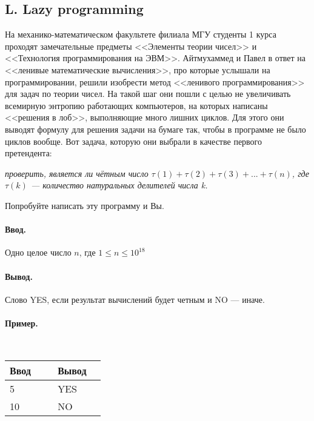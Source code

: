 \documentclass[12pt, a4paper]{article}
\newcommand{\informat}[1]
{
	\paragraph{Ввод.\\} #1
}
\newcommand{\outformat}[1]
{
	\paragraph{Вывод.\\} #1
}
\newcommand{\examplee}[4]
{
	\paragraph{Пример.\\}
	{\tt
	\begin{tabular}{|p{0.4\linewidth}|p{0.4\linewidth}|}
	\hline
	Ввод 	& Вывод  	\\
	\hline
	#1 		& #2 		\\
	\hline
	#3		& #4		\\
	\hline
	\end{tabular}
	}
}
\begin{document}
\subsection*{L. Lazy programming}

На механико-математическом факультете филиала МГУ студенты 1 курса проходят замечательные предметы <<Элементы теории чисел>> и <<Технология программирования на ЭВМ>>. Айтмухаммед и Павел в ответ на <<ленивые математические вычисления>>, про которые услышали на программировании, решили изобрести метод <<ленивого программирования>> для задач по теории чисел. На такой шаг они пошли с целью не увеличивать всемирную энтропию работающих компьютеров, на которых написаны <<решения в лоб>>, выполняющие много лишних циклов. Для этого они выводят формулу для решения задачи на бумаге так, чтобы в программе не было циклов вообще. Вот задача, которую они выбрали в качестве первого претендента:

\textit{проверить, является ли чётным число $\tau(1) + \tau(2) + \tau(3) + ... + \tau(n)$, \newline где $\tau(k)$ --- количество натуральных делителей числа k.}

Попробуйте написать эту программу и Вы. 

\informat{Одно целое число $n$, где $1 \le n \le 10^{18}$}

\outformat{Слово YES, если результат вычислений будет четным и NO --- иначе.}

\examplee{5}{YES}{10}{NO}
\end{document}
